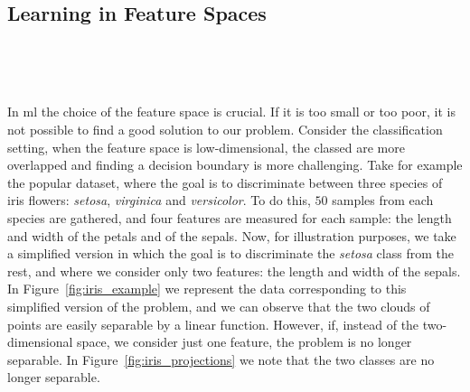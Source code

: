 \subsection{Learning in Feature Spaces} %

\begin{figure}[t!]
    \centering
    \quad%
    \\
    \caption{}
    \label{fig:iris}
\end{figure}

\begin{figure}[t!]
    \centering
    \quad%
    \quad
    \\
    \caption{}
    \label{fig:cubicreg}
\end{figure}

In \acrshort{ml} the choice of the feature space is crucial. If it is too small or too poor, it is not possible to find a good solution to our problem.
Consider the classification setting, when the feature space is low-dimensional, the classed are more overlapped and finding a decision boundary is more challenging. 
%
Take for example the popular  dataset, where the goal is to discriminate between three species of iris flowers: \emph{setosa}, \emph{virginica} and \emph{versicolor}. To do this, $50$ samples from each species are gathered, and four features are measured for each sample: the length and width of the petals and of the sepals.
%
Now, for illustration purposes, we take a simplified version in which the goal is to discriminate the \emph{setosa} class from the rest, and where we consider only two features: the length and width of the sepals. In Figure~\ref{fig:iris_example} we represent the data corresponding to this simplified version of the  problem, and we can observe that the two clouds of points are easily separable by a linear function. However, if, instead of the two-dimensional space, we consider just one feature, the problem is no longer separable. In Figure~\ref{fig:iris_projections} we note that the two classes are no longer separable.
%

